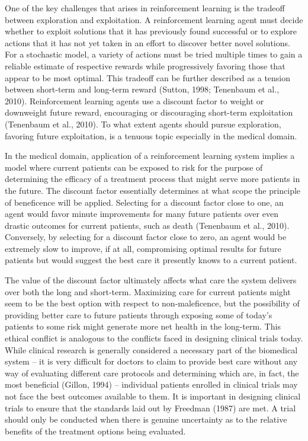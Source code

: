\documentclass[]{spie}  %
\begin{document}
One of the key challenges that arises in reinforcement learning is the tradeoff between exploration and exploitation. A reinforcement learning agent must decide whether to exploit solutions that it has previously found successful or to explore actions that it has not yet taken in an effort to discover better novel solutions. For a stochastic model, a variety of actions must be tried multiple times to gain a reliable estimate of respective rewards while progressively favoring those that appear to be most optimal. This tradeoff can be further described as a tension between short-term and long-term reward (Sutton, 1998; Tenenbaum et al., 2010). Reinforcement learning agents use a discount factor to weight or downweight future reward, encouraging or discouraging short-term exploitation (Tenenbaum et al., 2010). To what extent agents should pursue exploration, favoring future exploitation, is a tenuous topic especially in the medical domain.

In the medical domain, application of a reinforcement learning system implies a model where current patients can be exposed to risk for the purpose of determining the efficacy of a treatment process that might serve more patients in the future. The discount factor essentially determines at what scope the principle of beneficence will be applied. Selecting for a discount factor close to one, an agent would favor minute improvements for many future patients over even drastic outcomes for current patients, such as death (Tenenbaum et al., 2010). Conversely, by selecting for a discount factor close to zero, an agent would be extremely slow to improve, if at all, compromising optimal results for future patients but would suggest the best care it presently knows to a current patient.

The value of the discount factor ultimately affects what care the system delivers over both the long and short-term. Maximizing care for current patients might seem to be the best option with respect to non-maleficence, but the possibility of providing better care to future patients through exposing some of today’s patients to some risk might generate more net health in the long-term. This ethical conflict is analogous to the conflicts faced in designing clinical trials today. While clinical research is generally considered a necessary part of the biomedical system -- it is very difficult for doctors to claim to provide best care without any way of evaluating different care protocols and determining which are, in fact, the most beneficial (Gillon, 1994) -- individual patients enrolled in clinical trials may not face the best outcomes available to them. It is important in designing clinical trials to ensure that the standards laid out by Freedman (1987) are met. A trial should only be conducted when there is genuine uncertainty as to the relative benefits of the treatment options being evaluated.
\end{document}
